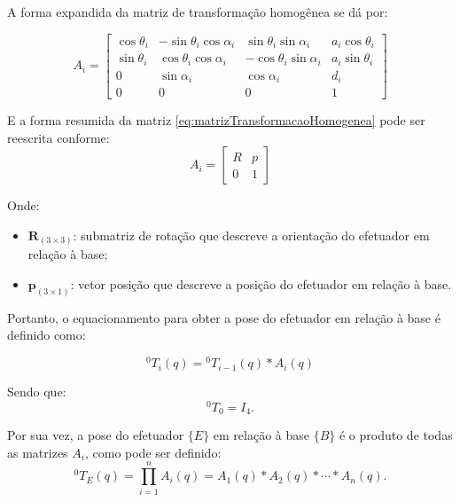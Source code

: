 A forma expandida da matriz de transformação homogênea se dá por:

\begin{equation}
    \label{eq:matrizTransformacaoHomogenea}
A_i =
\begin{bmatrix}
\cos\theta_i & -\sin\theta_i \cos\alpha_i & \sin\theta_i \sin\alpha_i & a_i \cos\theta_i \\
\sin\theta_i & \cos\theta_i \cos\alpha_i  & -\cos\theta_i \sin\alpha_i & a_i \sin\theta_i \\
0            & \sin\alpha_i               & \cos\alpha_i              & d_i \\
0            & 0                          & 0                         & 1
\end{bmatrix}
\end{equation}

E a forma resumida da matriz \eqref{eq:matrizTransformacaoHomogenea} pode ser reescrita conforme:
\begin{equation}
    \label{eq:matrizTransformacaoHomogenea_resumida}
A_i = 
\begin{bmatrix}
R & p \\
0 & 1
\end{bmatrix}
\end{equation}

Onde:
\begin{itemize}
    \item $\mathbf{R}_{(3\times 3)}$: submatriz de rotação que descreve a orientação do efetuador em relação à base;
    \item $\mathbf{p}_{(3\times 1)}$: vetor posição que descreve a posição do efetuador em relação à base.
\end{itemize}

Portanto, o equacionamento para obter a pose do efetuador em relação à base é definido como:

\begin{equation}
{}^{0}\!T_i(q)=
{}^{0}\!T_{i-1}(q)*
A_i(q)
\end{equation}

Sendo que:
\begin{equation}
{}^{0}\!T_0 = I_{4}.
\end{equation}

Por sua vez, a pose do efetuador $\{E\}$ em relação à base $\{B\}$ é o produto de todas as matrizes $A_i$, como pode ser definido:
\begin{equation}
    \label{eq:produtorio_generico}
{}^{0}\!T_E(q)= \prod_{i=1}^{n} A_i(q)
= A_1(q)*
A_2(q)*
\cdots*
A_n(q).
\end{equation}

